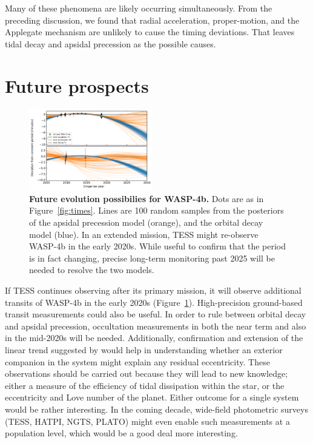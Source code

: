 \documentclass[12pt,twocolumn,tighten]{aastex62}
\begin{document}
Many of these phenomena are likely occurring simultaneously.  From the
preceding discussion, we found that radial acceleration,
proper-motion, and the Applegate mechanism are unlikely to cause the
timing deviations.  That leaves tidal decay and apsidal precession as
the possible causes.



\section{Future prospects}
\label{sec:future}

\begin{figure}[!t]
	\begin{center}
		\leavevmode
		\includegraphics[width=0.48\textwidth]{f5.pdf}
	\end{center}
  \vspace{-0.5cm}
	\caption{
		{\bf Future evolution possibilies for WASP-4b.}
		Dots are as in Figure~\ref{fig:times}.
		Lines are 100 random samples from the posteriors of the apsidal
		precession model (orange), and the orbital decay model (blue).
		In an extended mission, TESS might re-observe WASP-4b in the early
		2020s. While useful to confirm that the period is
		in fact changing, precise long-term monitoring past 2025 will
		be needed to resolve the two models.
		\label{fig:future}
	}
\end{figure}

If TESS continues observing after its primary mission, it will observe
additional transits of WASP-4b in the early 2020s
(Figure~\ref{fig:future}).  High-precision ground-based transit
measurements could also be useful.  In order to rule between orbital
decay and apsidal precession, occultation measurements in both
the near term and also in the mid-2020s will be needed.  Additionally, confirmation
and extension of the linear trend suggested by
\citet{knutson_friends_2014} would help in understanding whether an
exterior companion in the system might explain any residual
eccentricity.  These observations should be carried out because they
will lead to new knowledge; either a measure of the efficiency of tidal
dissipation within the star, or the eccentricity and Love number of the
planet.  Either outcome for a single system would be rather
interesting.  In the coming decade, wide-field photometric surveys
(TESS, HATPI, NGTS, PLATO) might even enable such measurements at a
population level, which would be a good deal more interesting.
\end{document}
